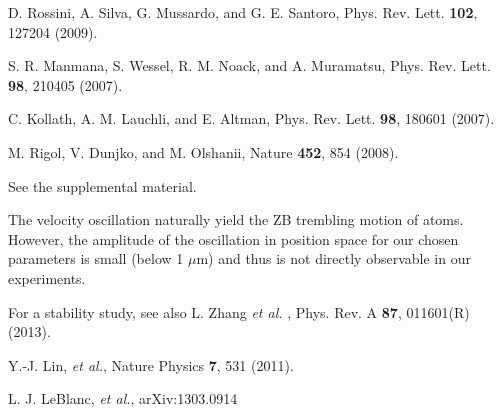 \documentclass[prl,aps,twocolumn,showpacs,floatfix]{revtex4-1}
\begin{document}
\begin{thebibliography}{99}
 D. Rossini, A. Silva, G. Mussardo, and G. E. Santoro, Phys.
Rev. Lett. \textbf{102}, 127204 (2009).

 S. R. Manmana, S. Wessel, R. M. Noack, and A. Muramatsu,
Phys. Rev. Lett. \textbf{98}, 210405 (2007).

 C. Kollath, A. M. Lauchli, and E. Altman, Phys. Rev. Lett.
\textbf{98}, 180601 (2007).

 M. Rigol, V. Dunjko, and M. Olshanii, Nature \textbf{452}, 854
(2008).

 See the supplemental material.

 The velocity oscillation naturally yield the ZB
trembling motion of atoms. However, the amplitude of the oscillation in
position space for our chosen parameters is small (below 1 $\mu $m) and thus
is not directly observable in our experiments.

 For a stability study, see also L. Zhang \textit{et al.%
}, Phys. Rev. A \textbf{87}, 011601(R) (2013).

 Y.-J. Lin, \textit{et al.}, Nature
Physics \textbf{7}, 531 (2011).

 L. J. LeBlanc, \textit{et al.}, arXiv:1303.0914
\end{thebibliography}
\end{document}
